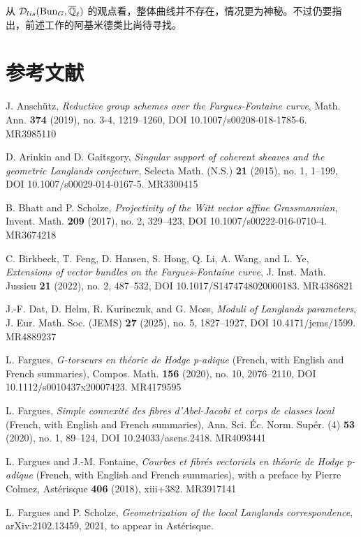 从 $\mathcal{D}_{lis}(\operatorname{Bun}_G,\overline{\mathbb{Q}}_\ell)$ 的观点看，整体曲线并不存在，情况更为神秘。不过仍要指出，前述工作的阿基米德类比尚待寻找。

\section*{参考文献}
\begin{refs}
\item[{[1]}] J. Ansch\"utz, \emph{Reductive group schemes over the Fargues-Fontaine curve}, Math. Ann. \textbf{374} (2019), no. 3-4, 1219--1260, DOI 10.1007/s00208-018-1785-6. MR3985110
\item[{[2]}] D. Arinkin and D. Gaitsgory, \emph{Singular support of coherent sheaves and the geometric Langlands conjecture}, Selecta Math. (N.S.) \textbf{21} (2015), no. 1, 1--199, DOI 10.1007/s00029-014-0167-5. MR3300415
\item[{[3]}] B. Bhatt and P. Scholze, \emph{Projectivity of the Witt vector affine Grassmannian}, Invent. Math. \textbf{209} (2017), no. 2, 329--423, DOI 10.1007/s00222-016-0710-4. MR3674218
\item[{[4]}] C. Birkbeck, T. Feng, D. Hansen, S. Hong, Q. Li, A. Wang, and L. Ye, \emph{Extensions of vector bundles on the Fargues-Fontaine curve}, J. Inst. Math. Jussieu \textbf{21} (2022), no. 2, 487--532, DOI 10.1017/S1474748020000183. MR4386821
\item[{[5]}] J.-F. Dat, D. Helm, R. Kurinczuk, and G. Moss, \emph{Moduli of Langlands parameters}, J. Eur. Math. Soc. (JEMS) \textbf{27} (2025), no. 5, 1827--1927, DOI 10.4171/jems/1599. MR4889237
\item[{[6]}] L. Fargues, \emph{G-torseurs en th\'eorie de Hodge p-adique} (French, with English and French summaries), Compos. Math. \textbf{156} (2020), no. 10, 2076--2110, DOI 10.1112/s0010437x20007423. MR4179595
\item[{[7]}] L. Fargues, \emph{Simple connexit\'e des fibres d'Abel-Jacobi et corps de classes local} (French, with English and French summaries), Ann. Sci. \'Ec. Norm. Sup\'er. (4) \textbf{53} (2020), no. 1, 89--124, DOI 10.24033/asens.2418. MR4093441
\item[{[8]}] L. Fargues and J.-M. Fontaine, \emph{Courbes et fibr\'es vectoriels en th\'eorie de Hodge p-adique} (French, with English and French summaries), with a preface by Pierre Colmez, Ast\'erisque \textbf{406} (2018), xiii+382. MR3917141
\item[{[9]}] L. Fargues and P. Scholze, \emph{Geometrization of the local Langlands correspondence}, arXiv:2102.13459, 2021, to appear in Ast\'erisque.

\end{refs}
